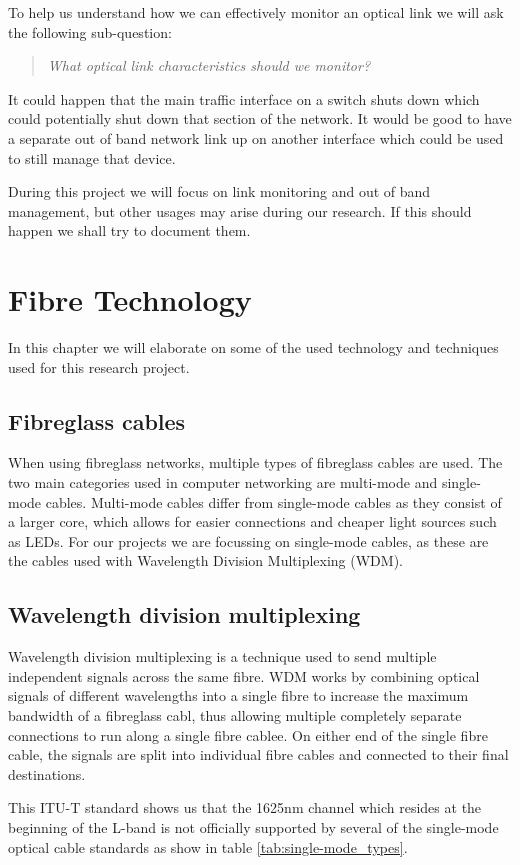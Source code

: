 \documentclass{article}
\begin{document}
To help us understand how we can effectively monitor an optical link we will ask the following sub-question:
\begin{quote}
\textit{
What optical link characteristics should we monitor?
}
\end{quote}

It could happen that the main traffic interface on a switch shuts down which could potentially shut down that section of the network.
It would be good to have a separate out of band network link up on another interface which could be used to still manage that device.

During this project we will focus on link monitoring and out of band management, but other usages may arise during our research.
If this should happen we shall try to document them.

\section{Fibre Technology}
In this chapter we will elaborate on some of the used technology and techniques used for this research project.
\subsection{Fibreglass cables}
When using fibreglass networks, multiple types of fibreglass cables are used.
The two main categories used in computer networking are multi-mode and single-mode cables.
Multi-mode cables differ from single-mode cables as they consist of a larger core, which allows for easier connections and cheaper light sources such as LEDs. \cite{Fundamentals:2008}
For our projects we are focussing on single-mode cables, as these are the cables used with Wavelength Division Multiplexing (WDM).

\subsection{Wavelength division multiplexing}
Wavelength division multiplexing is a technique used to send multiple independent signals across the same fibre.
WDM works by combining optical signals of different wavelengths into a single fibre to increase the maximum bandwidth of a fibreglass cabl, thus allowing multiple completely separate connections to run along a single fibre cablee.
On either end of the single fibre cable, the signals are split into individual fibre cables and connected to their final destinations.

This ITU-T standard shows us that the 1625nm channel which resides at the beginning of the L-band is not officially supported by several of the single-mode optical cable standards as show in table \ref{tab:single-mode_types}.
\end{document}
